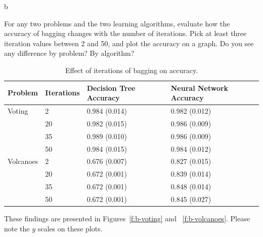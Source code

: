 \documentclass[fleqn]{homework}
\begin{document}
    \FloatBarrier
  \begin{problem}{b}
    \begin{question}
      For any two problems and the two learning algorithms, evaluate how the
      accuracy of bagging changes with the number of iterations. Pick at least
      three iteration values between 2 and 50, and plot the accuracy on a
      graph. Do you see any difference by problem? By algorithm?
    \end{question}
    \FloatBarrier

    \begin{table}[h]
      \centering
      \caption{Effect of iterations of bagging on accuracy.}
      \label{t:b}
      \begin{tabular}{ll|ll}
        \toprule
        Problem   & Iterations & Decision Tree Accuracy & Neural Network Accuracy \\
        \midrule
        Voting    & 2          & 0.984 (0.014)          & 0.982 (0.012)            \\
                  & 20         & 0.982 (0.015)          & 0.986 (0.009)            \\
                  & 35         & 0.989 (0.010)          & 0.986 (0.009)            \\
                  & 50         & 0.984 (0.015)          & 0.984 (0.012)            \\
        \midrule
        Volcanoes & 2          & 0.676 (0.007)          & 0.827 (0.015)            \\
                  & 20         & 0.672 (0.001)          & 0.839 (0.014)            \\
                  & 35         & 0.672 (0.001)          & 0.848 (0.014)            \\
                  & 50         & 0.672 (0.001)          & 0.845 (0.027)            \\
        \bottomrule
      \end{tabular}
    \end{table}

    These findings are presented in Figures~\ref{f:b-voting} and
    ~\ref{f:b-volcanoes}.  Please note the $y$ scales on these plots.


\end{problem}
\end{document}
